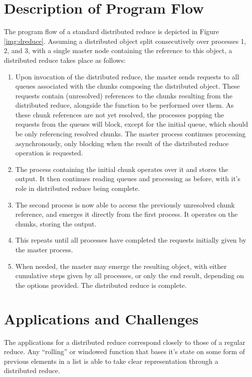 \documentclass[10pt, a4paper]{article}
\begin{document}
\section{Description of Program Flow}

The program flow of a standard distributed reduce is depicted in Figure \ref{img:dreduce}.
Assuming a distributed object split consecutively over processes 1, 2, and 3, with a single master node containing the reference to this object, a distributed reduce takes place as follows:
\begin{enumerate}
	\item Upon invocation of the distributed reduce, the master sends requests to all queues associated with the chunks composing the distributed object. These requests contain (unresolved) references to the chunks resulting from the distributed reduce, alongside the function to be performed over them. As these chunk references are not yet resolved, the processes popping the requests from the queues will block, except for the initial queue, which should be only referencing resolved chunks. The master process continues processing asynchronously, only blocking when the result of the distributed reduce operation is requested.
	\item The process containing the initial chunk operates over it and stores the output. It then continues reading queues and processing as before, with it's role in distributed reduce being complete.
	\item The second process is now able to access the previously unresolved chunk reference, and emerges it directly from the first process. It operates on the chunks, storing the output.
	\item This repeats until all processes have completed the requests initially given by the master process.
	\item When needed, the master may emerge the resulting object, with either cumulative steps given by all processes, or only the end result, depending on the options provided. The distributed reduce is complete.
\end{enumerate}

\section{Applications and Challenges}

The applications for a distributed reduce correspond closely to those of a regular reduce.
Any ``rolling'' or windowed function that bases it's state on some form of previous elements in a list is able to take clear representation through a distributed reduce.
\end{document}

